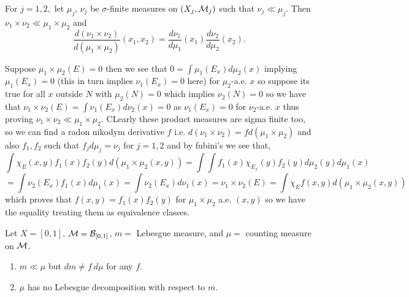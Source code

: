 \documentclass[12pt,a4paper]{article}
\begin{document}
\begin{problem}\label{prob:3-12}
For $j=1,2,$ let $\mu_{j}$, $\nu_{j}$ be $\sigma$-finite measures on $(X_{j},\mathcal{M}_{j})$ such that $\nu_{j}\ll\mu_{j}$. Then $\nu_{1}\times\nu_{2}\ll\mu_{1}\times\mu_{2}$ and
\[\frac{d(\nu_{1}\times\nu_{2})}{d(\mu_{1}\times\mu_{2})}(x_{1},x_{2})=\frac{d\nu_{1}}{d\mu_{1}}(x_{1})\frac{d\nu_{2}}{d\mu_{2}}(x_{2}).\]
\end{problem}
\begin{solution}
Suppose $\mu_1\times\mu_2(E)=0$ then we see that $0=\int\mu_1(E_x)d\mu_2(x)$ implying $\mu_1(E_x)=0$ (this in turn implies $\nu_1(E_x)=0$ here) for $\mu_2$-a.e. $x$ so suppose its true for all $x$ outside $N$ with $\mu_2(N)=0$ which implies $\nu_2(N)=0$ so we have that $\nu_1\times\nu_2(E)=\int\nu_1(E_x)d\nu_2(x)=0$ as $\nu_1(E_x)=0$ for $\nu_2$-a.e. $x$ thus proving $\nu_1\times\nu_2\ll\mu_1\times\mu_2.$ 
CLearly these product measures are sigma finite too, so we can find a radon nikodym derivative $f$ i.e. $d(\nu_1\times\nu_2)=fd(\mu_1\times\mu_2)$ and also $f_1,f_2$ such that $f_jd\mu_j=\nu_j$ for $j=1,2$ and by fubini's we see that,
\[
	\int\chi_E(x,y)f_1(x)f_2(y)d(\mu_1\times\mu_2(x,y))=\int\int f_1(x)\chi_{E_x}(y)f_2(y)d\mu_2(y)d\mu_1(x)
\]
\[
    =\int\nu_2(E_x)f_1(x)d\mu_1(x)=\int\nu_2(E_x)d\nu_1(x)=\nu_1\times\nu_2(E)=\int\chi_Ef(x,y)d(\mu_1\times\mu_2(x,y))
\]
which proves that $f(x,y)=f_1(x)f_2(y)$ for $\mu_1\times\mu_2$ a.e. $(x,y)$ so we have the equality treating them as equivalence classes.
\end{solution}
\begin{problem}\label{prob:3-13}
Let $X=[0,1]$, $\mathcal{M}=\mathcal{B}_{[0,1]}$, $m=$ Lebesgue measure, and $\mu=$ counting measure on $\mathcal{M}$.
\begin{enumerate}[label=\alph*.]
    \item $m\ll\mu$ but $dm\ne f~d\mu$ for any $f$.
    \item $\mu$ has no Lebesgue decomposition with respect to $m$.
\end{enumerate}
\end{problem}
\end{document}
